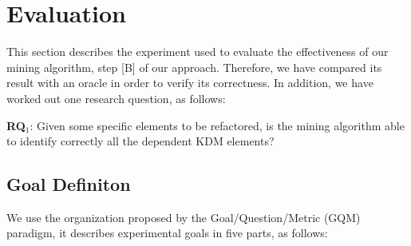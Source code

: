
\section{Evaluation}\label{sec:evaluation}

This section describes the experiment used to evaluate the effectiveness of our  mining algorithm, step [B] of our approach. Therefore, we have compared its result with an oracle in order to verify its correctness. %
In addition, we have worked out one research question, as follows:


\textbf{RQ$_{1}$}: Given some specific elements to be refactored, is the mining algorithm able to identify correctly all the dependent KDM elements?

 

\subsection{Goal Definiton}\label{sec:goal_definition}

We use the organization proposed by the Goal/Question/Metric (GQM) paradigm, it describes experimental goals in five parts, as follows:


